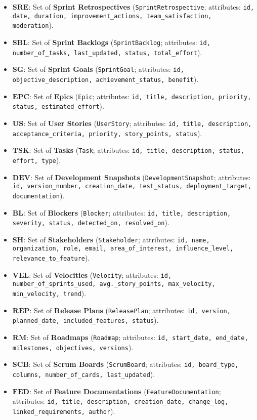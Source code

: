 \documentclass[11pt,a4paper]{article}
\begin{document}
\begin{itemize}[leftmargin=2em,label=\(\triangleright\)]
  \item \(\mathbf{SRE}\): Set of \textbf{Sprint Retrospectives} (\texttt{SprintRetrospective}; attributes: \texttt{id, date, duration, improvement\_actions, team\_satisfaction, moderation}).
  \item \(\mathbf{SBL}\): Set of \textbf{Sprint Backlogs} (\texttt{SprintBacklog}; attributes: \texttt{id, number\_of\_tasks, last\_updated, status, total\_effort}).
  \item \(\mathbf{SG}\): Set of \textbf{Sprint Goals} (\texttt{SprintGoal}; attributes: \texttt{id, objective\_description, achievement\_status, benefit}).
  \item \(\mathbf{EPC}\): Set of \textbf{Epics} (\texttt{Epic}; attributes: \texttt{id, title, description, priority, status, estimated\_effort}).
  \item \(\mathbf{US}\): Set of \textbf{User Stories} (\texttt{UserStory}; attributes: \texttt{id, title, description, acceptance\_criteria, priority, story\_points, status}).
  \item \(\mathbf{TSK}\): Set of \textbf{Tasks} (\texttt{Task}; attributes: \texttt{id, title, description, status, effort, type}).
  \item \(\mathbf{DEV}\): Set of \textbf{Development Snapshots} (\texttt{DevelopmentSnapshot}; attributes: \texttt{id, version\_number, creation\_date, test\_status, deployment\_target, documentation}).
  \item \(\mathbf{BL}\): Set of \textbf{Blockers} (\texttt{Blocker}; attributes: \texttt{id, title, description, severity, status, detected\_on, resolved\_on}).
  \item \(\mathbf{SH}\): Set of \textbf{Stakeholders} (\texttt{Stakeholder}; attributes: \texttt{id, name, organization, role, email, area\_of\_interest, influence\_level, relevance\_to\_feature}).
  \item \(\mathbf{VEL}\): Set of \textbf{Velocities} (\texttt{Velocity}; attributes: \texttt{id, number\_of\_sprints\_used, avg.\_story\_points, max\_velocity, min\_velocity, trend}).
  \item \(\mathbf{REP}\): Set of \textbf{Release Plans} (\texttt{ReleasePlan}; attributes: \texttt{id, version, planned\_date, included\_features, status}).
  \item \(\mathbf{RM}\): Set of \textbf{Roadmaps} (\texttt{Roadmap}; attributes: \texttt{id, start\_date, end\_date, milestones, objectives, versions}).
  \item \(\mathbf{SCB}\): Set of \textbf{Scrum Boards} (\texttt{ScrumBoard}; attributes: \texttt{id, board\_type, columns, number\_of\_cards, last\_updated}).
  \item \(\mathbf{FED}\): Set of \textbf{Feature Documentations} (\texttt{FeatureDocumentation}; attributes: \texttt{id, title, description, creation\_date, change\_log, linked\_requirements, author}).
\end{itemize}
\end{document}
